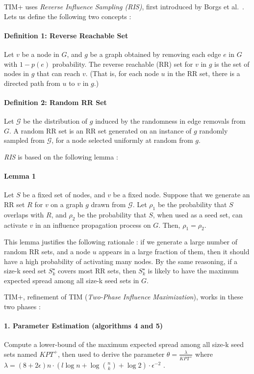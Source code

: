 \documentclass[a4paper,12pt]{article}
\begin{document}
TIM+ uses \emph{Reverse Influence Sampling (RIS)}, first introduced by Borgs et al.~\cite{borgs2014maximizing}. Lets us define the following two concepts :

\paragraph{Definition 1: Reverse Reachable Set}
Let $v$ be a node in $G$, and $g$ be a graph obtained by removing each edge $e$ in $G$ with $1 - p(e)$ probability. The reverse reachable (RR) set for $v$ in $g$ is the set of nodes in $g$ that can reach $v$. (That is, for each node $u$ in the RR set, there is a directed path from $u$ to $v$ in $g$.)

\paragraph{Definition 2: Random RR Set}
Let $\mathcal{G}$ be the distribution of $g$ induced by the randomness in edge removals from $G$. A random RR set is an RR set generated on an instance of $g$ randomly sampled from $\mathcal{G}$, for a node selected uniformly at random from $g$.

\emph{RIS} is based on the following lemma : 

\paragraph{Lemma 1}
Let $S$ be a fixed set of nodes, and $v$ be a fixed node.
Suppose that we generate an RR set $R$ for $v$ on a graph $g$ drawn from $\mathcal{G}$. Let $\rho_1$ be the probability that $S$ overlaps with $R$, and $\rho_2$ be the probability that $S$, when used as a seed set, can activate $v$ in an influence propagation process on $G$. Then, $\rho_1 = \rho_2$.

This lemma justifies the following rationale : if we generate a large number of random RR sets, and a node $u$ appears in a large fraction of them, then it should have a high probability of activating many nodes. By the same reasoning, if a size-k seed set
$S_k^{\star}$ covers most RR sets, then $S_k^{\star}$ is likely to have the maximum expected spread among all size-k seed sets in $G$.

TIM+, refinement of TIM (\emph{Two-Phase Influence Maximization}), works in these two phases :

\paragraph{1. Parameter Estimation (algorithms 4 and 5)}
Compute a lower-bound of the maximum expected spread among all size-k seed sets named $KPT^+$, then used to derive the parameter $\theta = \frac{\lambda}{KPT^+}$ where $\lambda = (8 + 2 \epsilon)n \cdot (l \log n + \log \binom{n}{k}+ \log 2) \cdot \epsilon^{-2}$ .
% 
\end{document}
